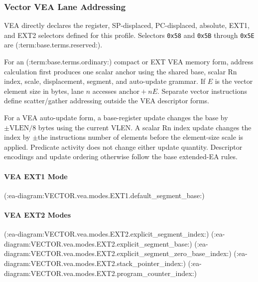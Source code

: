 \subsubsection{Vector VEA Lane Addressing}
VEA directly declares the register, SP-displaced, PC-displaced, absolute, EXT1, and EXT2 selectors defined for
this profile. Selectors \texttt{0x58} and \texttt{0x5B} through \texttt{0x5E} are
(:term:base.terms.reserved:).

For an (:term:base.terms.ordinary:) compact or EXT VEA memory form, address calculation first produces one scalar anchor using the
shared base, scalar Rn index, scale, displacement, segment, and auto-update grammar. If $E$ is the vector element
size in bytes, lane $n$ accesses \(\mathrm{anchor} + nE\). Separate vector instructions define scatter/gather addressing outside the
VEA descriptor forms.

For a VEA auto-update form, a base-register update changes the base by
\(\pm\mathrm{VLEN}/8\) bytes using the current VLEN. A scalar Rn index update
changes the index by \(\pm\)the instruction\textquotesingle{}s number of elements before the element-size scale is
applied. Predicate activity does not change either update quantity. Descriptor encodings and update ordering otherwise
follow the base extended-EA rules.

\clearpage
\paragraph{VEA EXT1 Mode}\mbox{}\par
(:ea-diagram:VECTOR.vea.modes.EXT1.default_segment_base:)

\clearpage
\paragraph{VEA EXT2 Modes}\mbox{}\par
(:ea-diagram:VECTOR.vea.modes.EXT2.explicit_segment_index:)
\clearpage
(:ea-diagram:VECTOR.vea.modes.EXT2.explicit_segment_base:)
\clearpage
(:ea-diagram:VECTOR.vea.modes.EXT2.explicit_segment_zero_base_index:)
\clearpage
(:ea-diagram:VECTOR.vea.modes.EXT2.stack_pointer_index:)
\clearpage
(:ea-diagram:VECTOR.vea.modes.EXT2.program_counter_index:)

\clearpage
